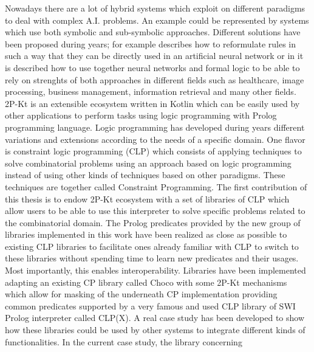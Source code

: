 Nowadays there are a lot of hybrid systems which exploit on different paradigms to deal with complex A.I. problems.
An example could be represented by systems which use both symbolic and sub-symbolic approaches. Different solutions have been proposed during
years; for example \cite{TOWELL1994119} describes how to reformulate rules in such a way that they can be directly used in an
artificial neural network or in \cite{https://doi.org/10.48550/arxiv.2209.12618} it is described how to use together neural networks and formal logic to be able to rely on
strenghts of both approaches in different fields such as healthcare, image processing, business management, information retrieval and many other fields.\newline\newline
2P-Kt is an extensible ecosystem written in Kotlin which can be easily used by other applications to perform tasks using logic programming with Prolog programming language.
Logic programming has developed during years different variations and extensions according to the needs of a specific domain. One flavor is constraint logic programming (CLP) which
consists of applying techniques to solve combinatorial problems using an approach based on logic programming instead of using
other kinds of techniques based on other paradigms. These techniques are together called Constraint Programming.\newline\newline
The first contribution of this thesis is to endow 2P-Kt ecosystem with a set of libraries of CLP which allow users to be able to use this interpreter to solve specific
problems related to the combinatorial domain. The Prolog predicates provided by the new group of libraries implemented in this work have been realized as close as
possible to existing CLP libraries to facilitate ones already familiar with CLP to switch to these libraries without spending time to learn new
predicates and their usages. Most importantly, this enables interoperability.\newline
Libraries have been implemented adapting an existing CP library called Choco with some 2P-Kt mechanisms which allow
for masking of the underneath CP implementation providing common predicates supported by a very famous and used CLP library of SWI Prolog interpreter called
CLP(X).\newline\newline
A real case study has been developed to show how these libraries could be used by other systems to integrate different kinds of functionalities. In the current case study, the library concerning

